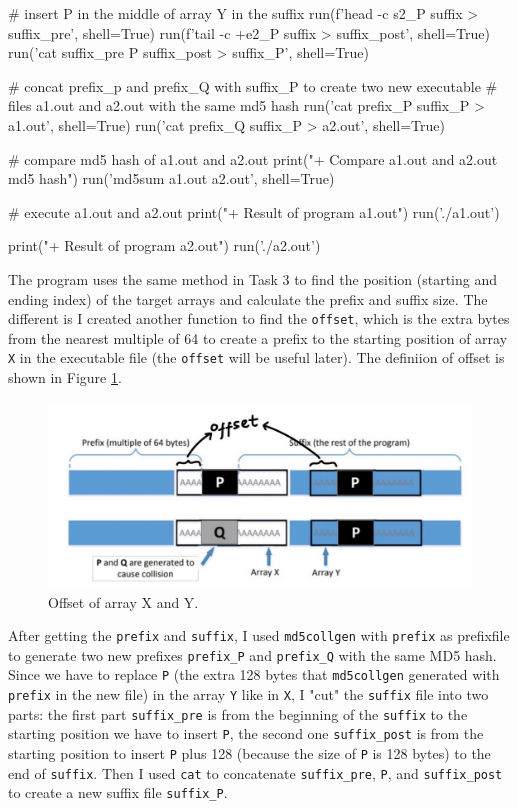 \documentclass{article}
\begin{document}
\begin{python}
    # insert P in the middle of array Y in the suffix
    run(f'head -c {s2_P} suffix > suffix_pre', shell=True)
    run(f'tail -c +{e2_P} suffix > suffix_post', shell=True)
    run('cat suffix_pre P suffix_post > suffix_P', shell=True)

    # concat prefix_p and prefix_Q with suffix_P to create two new executable
    # files a1.out and a2.out with the same md5 hash
    run('cat prefix_P suffix_P > a1.out', shell=True)
    run('cat prefix_Q suffix_P > a2.out', shell=True)

    # compare md5 hash of a1.out and a2.out
    print("\n+ Compare a1.out and a2.out md5 hash")
    run('md5sum a1.out a2.out', shell=True)

    # execute a1.out and a2.out
    print("\n+ Result of program a1.out")
    run('./a1.out')

    print("\n+ Result of program a2.out")
    run('./a2.out')
\end{python}

The program uses the same method in Task 3 to find the position (starting
and ending index) of the target arrays and calculate the prefix and suffix size.
The different is I created another function to find the \texttt{offset}, which
is the extra bytes from the nearest multiple of 64 to create a prefix to the
starting position of array \texttt{X} in the executable file (the \texttt{offset}
will be useful later). The definiion of offset is shown in Figure \ref{fig:task4_offset}.

\begin{figure}[!ht]
    \centering
    \includegraphics[scale=0.25]{task4.1.jpg}
    \caption{Offset of array X and Y.}
    \label{fig:task4_offset}
\end{figure}

After getting the \texttt{prefix} and \texttt{suffix}, I used \texttt{md5collgen}
with \texttt{prefix} as prefixfile to generate two new prefixes \texttt{prefix\_P}
and \texttt{prefix\_Q} with the same MD5 hash. Since we have to replace \texttt{P}
(the extra 128 bytes that \texttt{md5collgen} generated with \texttt{prefix} in
the new file) in the array \texttt{Y} like in \texttt{X}, I "cut" the \texttt{suffix}
file into two parts: the first part \texttt{suffix\_pre} is from the beginning of the \texttt{suffix}
to the starting position we have to insert \texttt{P}, the second one \texttt{suffix\_post}
is from the starting position to insert \texttt{P} plus 128 (because the size of
\texttt{P} is 128 bytes) to the end of \texttt{suffix}. Then I used \texttt{cat}
to concatenate \texttt{suffix\_pre}, \texttt{P}, and \texttt{suffix\_post} to
create a new suffix file \texttt{suffix\_P}.
\end{document}
